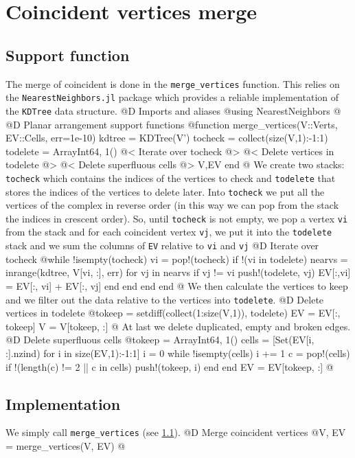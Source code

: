 \documentclass[10pt]{book}
\begin{document}
\section{Coincident vertices merge}
\subsection{Support function}
\label{sec:merge_vertices}
The merge of coincident is done in the \texttt{merge\_vertices}
function. This relies on the \texttt{NearestNeighbors.jl} package\cite{NearestNeighbors}
which provides a reliable implementation of the \texttt{KDTree} data structure.
@D Imports and aliases
@{using NearestNeighbors
@}
@D Planar arrangement support functions
@{function merge_vertices(V::Verts, EV::Cells, err=1e-10)
    kdtree = KDTree(V')
    tocheck = collect(size(V,1):-1:1)
    todelete = Array{Int64, 1}()
    @< Iterate over tocheck @>
    @< Delete vertices in todelete @>
    @< Delete superfluous cells @>
    V,EV
end
@}
We create two stacks: \texttt{tocheck} which contains the indices of the vertices
to check and \texttt{todelete} that stores the indices of the vertices to delete later.
Into \texttt{tocheck} we put all the vertices of the complex in reverse order (in
this way we can pop from the stack the indices in crescent order). So, until \texttt{tocheck} is not empty,
we pop a vertex \texttt{vi} from the stack and for each coincident vertex \texttt{vj}, we put it 
into the \texttt{todelete} stack and we sum the columns of \texttt{EV} relative to \texttt{vi} and \texttt{vj}
@D Iterate over tocheck 
@{while !isempty(tocheck)
    vi = pop!(tocheck)
    if !(vi in todelete)
        nearvs = inrange(kdtree, V[vi, :], err)
        for vj in nearvs
            if vj != vi
                push!(todelete, vj)
                EV[:,vi] = EV[:, vi] + EV[:, vj]
            end
        end
    end
end
@}
We then calculate the vertices to keep and we filter out
the data relative to the vertices into \texttt{todelete}.
@D Delete vertices in todelete
@{tokeep = setdiff(collect(1:size(V,1)), todelete)
EV = EV[:, tokeep]
V = V[tokeep, :]
@}
At last we delete duplicated, empty and broken edges.
@D Delete superfluous cells
@{tokeep = Array{Int64, 1}()
cells = [Set(EV[i, :].nzind) for i in size(EV,1):-1:1]
i = 0
while !isempty(cells)
    i += 1
    c = pop!(cells)
    if !(length(c) != 2 || c in cells)
        push!(tokeep, i)
    end
end
EV = EV[tokeep, :]
@}
\subsection{Implementation}
We simply call \texttt{merge\_vertices} (see \ref{sec:merge_vertices}).
@D Merge coincident vertices
@{V, EV = merge_vertices(V, EV)
@}
\end{document}
